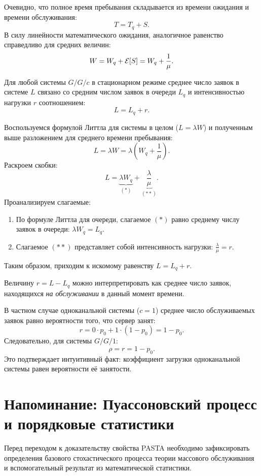 Очевидно, что полное время пребывания складывается из времени ожидания и времени обслуживания:
$$ T = T_q + S. $$
В силу линейности математического ожидания, аналогичное равенство справедливо для средних величин:
$$ W = W_q + \mathcal{E}[S] = W_q + \frac{1}{\mu}. $$

\begin{statement}
Для любой системы $G/G/c$ в стационарном режиме среднее число заявок в системе $L$ связано со средним числом заявок в очереди $L_q$ и интенсивностью нагрузки $r$ соотношением:
$$ L = L_q + r. $$
\end{statement}

\begin{sproof}
Воспользуемся формулой Литтла для системы в целом ($L = \lambda W$) и полученным выше разложением для среднего времени пребывания:
$$
L = \lambda W = \lambda \left( W_q + \frac{1}{\mu} \right).
$$
Раскроем скобки:
$$
L = \underbrace{\lambda W_q}_{(*)} + \underbrace{\frac{\lambda}{\mu}}_{(**)}.
$$
Проанализируем слагаемые:
\begin{enumerate}
    \item По формуле Литтла для очереди, слагаемое $(*)$ равно среднему числу заявок в очереди: $\lambda W_q = L_q$.
    \item Слагаемое $(**)$ представляет собой интенсивность нагрузки: $\frac{\lambda}{\mu} = r$.
\end{enumerate}
Таким образом, приходим к искомому равенству $L = L_q + r$.
\end{sproof}

\begin{conseq}
Величину $r = L - L_q$ можно интерпретировать как среднее число заявок, находящихся \textit{на обслуживании} в данный момент времени.

В частном случае одноканальной системы ($c=1$) среднее число обслуживаемых заявок равно вероятности того, что сервер занят:
$$
r = 0 \cdot p_0 + 1 \cdot (1 - p_0) = 1 - p_0.
$$
Следовательно, для системы $G/G/1$:
$$ \rho = r = 1 - p_0. $$
Это подтверждает интуитивный факт: коэффициент загрузки одноканальной системы равен вероятности её занятости.
\end{conseq}

\section{Напоминание: Пуассоновский процесс и порядковые статистики}

Перед переходом к доказательству свойства PASTA необходимо зафиксировать определения базового стохастического процесса теории массового обслуживания и вспомогательный результат из математической статистики.

